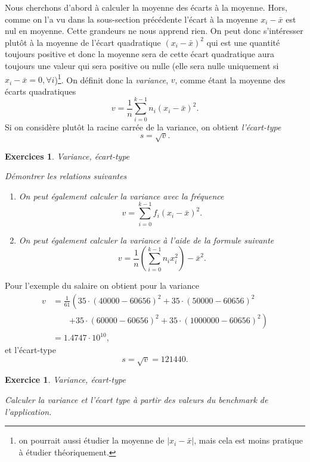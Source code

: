 \documentclass[a4paper,12pt]{book}
\newtheorem*{exercice}{Exercice}
\newtheorem*{exercices}{Exercices}
\begin{document}
Nous cherchons d'abord à calculer la moyenne des écarts à la moyenne. 
Hors, comme on l'a vu dans la sous-section précédente l'écart à la moyenne $x_i-\bar{x}$ est nul en moyenne. Cette grandeurs ne nous apprend rien. 
On peut donc s'intéresser plutôt à la moyenne de l'écart quadratique $(x_i-\bar{x})^2$ qui est une quantité toujours positive et donc la moyenne sera 
de cette écart quadratique aura toujours une valeur qui sera positive ou nulle (elle sera nulle uniquement si 
$x_i-\bar{x}=0,\forall i$)\footnote{on pourrait aussi étudier la moyenne de $|x_i-\bar{x}|$, mais cela est moins pratique à étudier théoriquement.}.
On définit donc la \textit{variance}, $v$, comme étant la moyenne des écarts quadratiques
\begin{equation}
 v=\frac{1}{n}\sum_{i=0}^{k-1}n_i(x_i-\bar{x})^2.
\end{equation}
Si on considère plutôt la racine carrée de la variance, on obtient \textit{l'écart-type}
\begin{equation}
 s=\sqrt{v}.
\end{equation}
\begin{exercices}{Variance, écart-type}

Démontrer les relations suivantes
 \begin{enumerate}
  \item On peut également calculer la variance avec la fréquence
  \begin{equation}
   v=\sum_{i=0}^{k-1}f_i(x_i-\bar{x})^2.
  \end{equation}
  \item On peut également calculer la variance à l'aide de la formule suivante
  \begin{equation}
   v=\frac{1}{n}\left(\sum_{i=0}^{k-1}n_ix_i^2\right)-\bar{x}^2.
  \end{equation}
 \end{enumerate}
\end{exercices}
Pour l'exemple du salaire on obtient pour la variance
\begin{align}
 v&=\frac{1}{61}\left(35\cdot(40000-60656)^2+35\cdot(50000-60656)^2\right.\nonumber\\
 &\quad\quad\left.+35\cdot(60000-60656)^2+35\cdot(1000000-60656)^2\right)\nonumber\\
 &=1.4747\cdot 10^{10},
\end{align}
et l'écart-type
\begin{equation}
 s=\sqrt{v}=121440.
\end{equation}
\begin{exercice}{Variance, écart-type}

Calculer la variance et l'écart type à partir des valeurs du benchmark de l'application.
\end{exercice}
\end{document}

